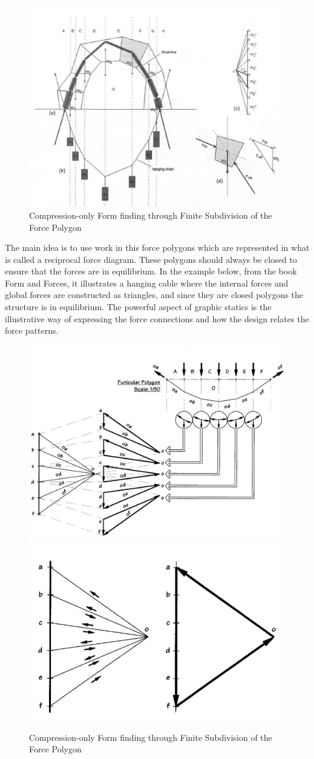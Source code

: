 \begin{figure}[H]
\centering
\includegraphics[width=0.6\linewidth ]{figure/Introduction/GraphStat4.JPG}
\caption{Compression-only Form finding through Finite Subdivision of the
Force Polygon\cite{ref:Form} }
\end{figure}

The main idea is to use work in this force polygons which are represented in what is called a reciprocal force diagram. These polygons should always be closed to ensure that the forces are in equilibrium. In the example below, from the book Form and Forces, it illustrates a hanging cable where the internal forces and global forces are constructed as triangles, and since they are closed polygons the structure is in equilibrium. The powerful aspect of graphic statics is the illustrative way of expressing the force connections and how the design relates the force patterns.   


\begin{figure}[H]
\centering
\includegraphics[width=0.6\linewidth ]{figure/Introduction/GraphStat2.JPG}
\includegraphics[width=0.35\linewidth ]{figure/Introduction/GraphStat3.JPG}
\caption{Compression-only Form finding through Finite Subdivision of the
Force Polygon \cite{ref:Form} }
\end{figure}


